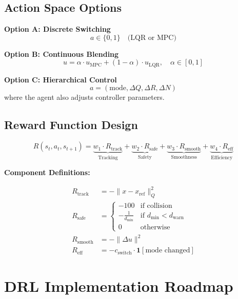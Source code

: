 \documentclass[11pt,a4paper]{article}
\begin{document}
\subsection{Action Space Options}

\textbf{Option A: Discrete Switching}
\begin{equation}
  a \in \{0, 1\} \quad \text{(LQR or MPC)}
\end{equation}

\textbf{Option B: Continuous Blending}
\begin{equation}
  u = \alpha \cdot u_{\text{MPC}} + (1 - \alpha) \cdot u_{\text{LQR}}, \quad \alpha \in [0, 1]
\end{equation}

\textbf{Option C: Hierarchical Control}
\begin{equation}
  a = (\text{mode}, \Delta Q, \Delta R, \Delta N)
\end{equation}
where the agent also adjusts controller parameters.

\subsection{Reward Function Design}

\begin{equation}
  R(s_t, a_t, s_{t+1}) = \underbrace{w_1 \cdot R_{\text{track}}}_{\text{Tracking}} + \underbrace{w_2 \cdot R_{\text{safe}}}_{\text{Safety}} + \underbrace{w_3 \cdot R_{\text{smooth}}}_{\text{Smoothness}} + \underbrace{w_4 \cdot R_{\text{eff}}}_{\text{Efficiency}}
\end{equation}

\textbf{Component Definitions:}

\begin{align}
  R_{\text{track}} &= -\|x - x_{\text{ref}}\|_Q^2 \\
  R_{\text{safe}} &= 
  \begin{cases}
    -100 & \text{if collision} \\
    -\frac{1}{d_{\min}} & \text{if } d_{\min} < d_{\text{warn}} \\
    0 & \text{otherwise}
  \end{cases} \\
  R_{\text{smooth}} &= -\|\Delta u\|^2 \\
  R_{\text{eff}} &= -c_{\text{switch}} \cdot \mathbf{1}[\text{mode changed}]
\end{align}

\section{DRL Implementation Roadmap}
\end{document}
